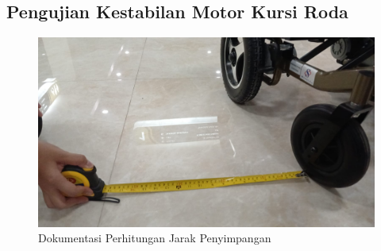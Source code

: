 \subsection*{Pengujian Kestabilan Motor Kursi Roda}
\begin{figure} [ht] \centering
  \includegraphics[scale=0.28]{gambar/lampiran/Pengujian Kestabilan.jpg}
  \caption{Dokumentasi Perhitungan Jarak Penyimpangan}
  \label{fig:DokumentasiJarakPenyimpangan}
\end{figure}